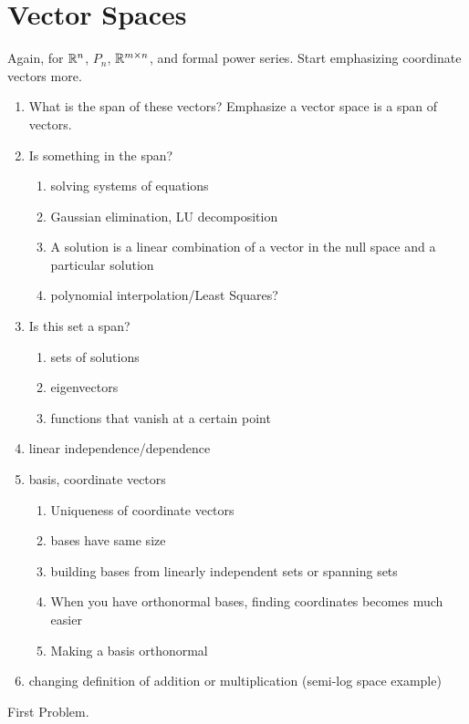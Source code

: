\chapter{Vector Spaces}

Again, for $\mathbb{R}^n$, $P_n$, $\mathbb{R}^{m\times n}$, and formal power
series. Start emphasizing coordinate vectors more.
\begin{enumerate}
\item What is the span of these vectors?  Emphasize a vector space is
  a span of vectors.

\item Is something in the span?
  \begin{enumerate}
  \item solving systems of equations
  \item Gaussian elimination, LU decomposition
  \item A solution is a linear combination of a vector in the null
    space and a particular solution
  \item polynomial interpolation/Least Squares?
  \end{enumerate}

\item Is this set a span?
  \begin{enumerate}
  \item sets of solutions
  \item eigenvectors
  \item functions that vanish at a certain point
  \end{enumerate}

\item linear independence/dependence

\item basis, coordinate vectors
  \begin{enumerate}
  \item Uniqueness of coordinate vectors
  \item bases have same size
  \item building bases from linearly independent sets or spanning sets
  \item When you have orthonormal bases, finding coordinates becomes
    much easier
  \item Making a basis orthonormal
  \end{enumerate}

\item changing definition of addition or multiplication (semi-log
  space example)
\end{enumerate}

\begin{problem}
  First Problem.
\end{problem}


